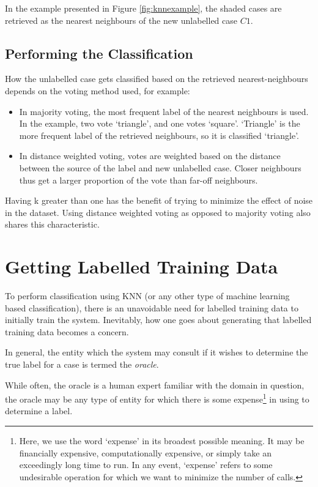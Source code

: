 \documentclass[a4paper,11pt]{report}
\begin{document}
In the example presented in Figure \ref{fig:knnexample}, the shaded cases are retrieved as the nearest neighbours of the new unlabelled case $C1$. 

\subsection{Performing the Classification}

How the unlabelled case gets classified based on the retrieved nearest-neighbours depends on the voting method used, for example:
\begin{itemize}
	\item In majority voting, the most frequent label of the nearest neighbours is used. In the example, two vote `triangle', and one votes `square'. `Triangle' is the more frequent label of the retrieved neighbours, so it is classified `triangle'.
	\item In distance weighted voting, votes are weighted based on the distance between the source of the label and new unlabelled case. Closer neighbours thus get a larger proportion of the vote than far-off neighbours.
\end{itemize}

Having k greater than one has the benefit of trying to minimize the effect of noise in the dataset. Using distance weighted voting as opposed to majority voting also shares this characteristic. 


\section{Getting Labelled Training Data}

To perform classification using KNN (or any other type of machine learning based classification), there is an unavoidable need for labelled training data to initially train the system. Inevitably, how one goes about generating that labelled training data becomes a concern.

In general, the entity which the system may consult if it wishes to determine the true label for a case is termed the \emph{oracle}.

While often, the oracle is a human expert familiar with the domain in question, the oracle may be any type of entity for which there is some expense\footnote{Here, we use the word `expense' in its broadest possible meaning. It may be financially expensive, computationally expensive, or simply take an exceedingly long time to run. In any event, `expense' refers to some undesirable operation for which we want to minimize the number of calls.} in using to determine a label. 
\end{document}
